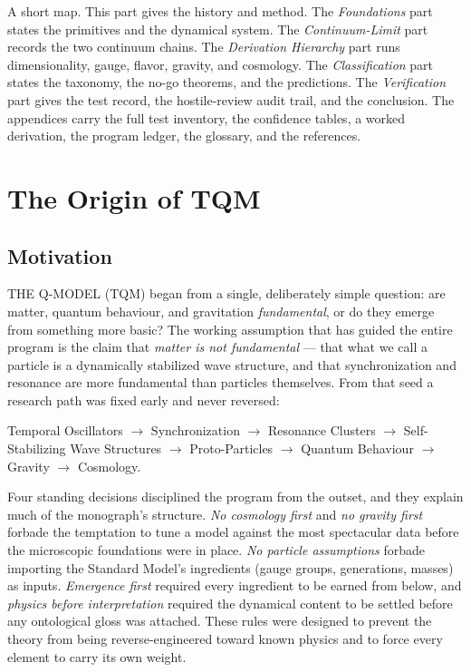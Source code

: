 \documentclass[10pt,twoside,openany]{book}
\begin{document}
A short map. This part gives the history and method. The \emph{Foundations} part states
the primitives and the dynamical system. The \emph{Continuum-Limit} part records the two
continuum chains. The \emph{Derivation Hierarchy} part runs dimensionality, gauge, flavor,
gravity, and cosmology. The \emph{Classification} part states the taxonomy, the no-go
theorems, and the predictions. The \emph{Verification} part gives the test record, the
hostile-review audit trail, and the conclusion. The appendices carry the full test
inventory, the confidence tables, a worked derivation, the program ledger, the glossary,
and the references.

\chapter{The Origin of TQM}
\label{ch:origin}

\section{Motivation}

THE Q-MODEL (TQM) began from a single, deliberately simple question: are matter, quantum
behaviour, and gravitation \emph{fundamental}, or do they emerge from something more
basic? The working assumption that has guided the entire program is the claim that
\emph{matter is not fundamental} --- that what we call a particle is a dynamically
stabilized wave structure, and that synchronization and resonance are more fundamental
than particles themselves. From that seed a research path was fixed early and never
reversed:

\begin{center}
Temporal Oscillators $\to$ Synchronization $\to$ Resonance Clusters $\to$
Self-Stabilizing Wave Structures $\to$ Proto-Particles $\to$ Quantum Behaviour $\to$
Gravity $\to$ Cosmology.
\end{center}

Four standing decisions disciplined the program from the outset, and they explain much of
the monograph's structure. \emph{No cosmology first} and \emph{no gravity first} forbade
the temptation to tune a model against the most spectacular data before the microscopic
foundations were in place. \emph{No particle assumptions} forbade importing the Standard
Model's ingredients (gauge groups, generations, masses) as inputs. \emph{Emergence first}
required every ingredient to be earned from below, and \emph{physics before
interpretation} required the dynamical content to be settled before any ontological gloss
was attached. These rules were designed to prevent the theory from being
reverse-engineered toward known physics and to force every element to carry its own
weight.
\end{document}
